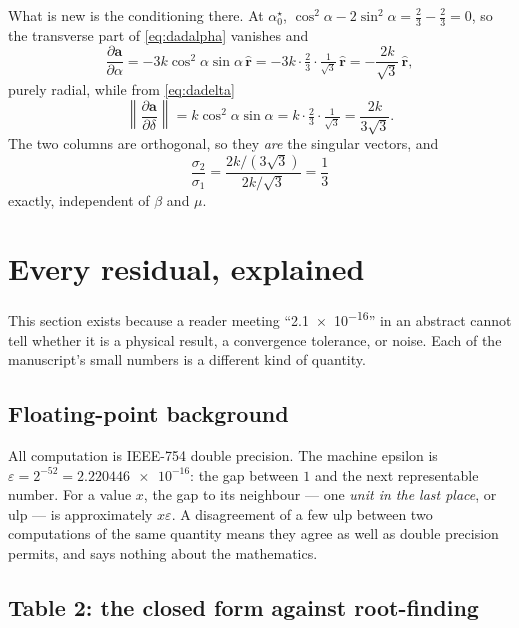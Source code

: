 \documentclass[11pt,a4paper]{article}
\newcommand{\rhat}{\hat{\bm{r}}}
\begin{document}
What is new is the conditioning there. At $\alpha_0^\star$,
$\cos^2\!\alpha-2\sin^2\!\alpha=\tfrac23-\tfrac23=0$, so the transverse part of
\eqref{eq:dadalpha} vanishes and
\begin{equation}
  \frac{\partial\bm a}{\partial\alpha}
  = -3k\cos^2\!\alpha\sin\alpha\,\rhat
  = -3k\cdot\tfrac23\cdot\tfrac{1}{\sqrt3}\,\rhat
  = -\frac{2k}{\sqrt3}\,\rhat ,
\end{equation}
purely radial, while from \eqref{eq:dadelta}
\begin{equation}
  \left\lVert\frac{\partial\bm a}{\partial\delta}\right\rVert
  = k\cos^2\!\alpha\sin\alpha = k\cdot\tfrac23\cdot\tfrac1{\sqrt3}
  = \frac{2k}{3\sqrt3} .
\end{equation}
The two columns are orthogonal, so they \emph{are} the singular vectors, and
\begin{equation}
  \frac{\sigma_2}{\sigma_1}
  = \frac{2k/(3\sqrt3)}{2k/\sqrt3} = \frac13
\end{equation}
exactly, independent of $\beta$ and $\mu$.

\section{Every residual, explained}\label{sec:resid}

This section exists because a reader meeting ``\num{2.1e-16}'' in an abstract
cannot tell whether it is a physical result, a convergence tolerance, or noise.
Each of the manuscript's small numbers is a different kind of quantity.

\subsection{Floating-point background}

All computation is IEEE-754 double precision. The machine epsilon is
$\varepsilon=2^{-52}=\num{2.220446e-16}$: the gap between $1$ and the next
representable number. For a value $x$, the gap to its neighbour --- one
\emph{unit in the last place}, or ulp --- is approximately $x\varepsilon$. A
disagreement of a few ulp between two computations of the same quantity means
they agree as well as double precision permits, and says nothing about the
mathematics.

\subsection{Table 2: the closed form against root-finding}
\end{document}
